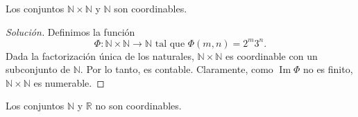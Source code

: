 \begin{example}
    Los conjuntos $\mathbb{N} \times \mathbb{N}$ y $\mathbb{N}$ son coordinables.
\end{example}

\begin{proof}[Solución]
    Definimos la función 
    $$
        \Phi : \mathbb{N} \times \mathbb{N} \to \mathbb{N} \text{ tal que }\Phi (m, n) = 2^{m} 3^{n}.
    $$
    Dada la factorización única de los naturales, $\mathbb{N} \times \mathbb{N}$ es coordinable con un subconjunto de $\mathbb{N}$. Por lo tanto, es contable. Claramente, como $\operatorname{Im} \Phi$ no es finito, $\mathbb{N} \times \mathbb{N}$ es numerable.
\end{proof}

\begin{example}
    Los conjuntos $\mathbb{N}$ y $\mathbb{R}$ no son coordinables.
\end{example}

